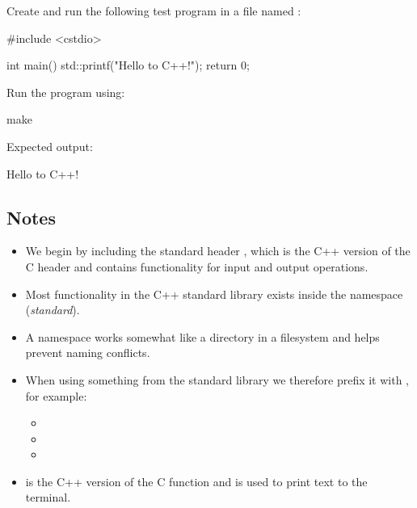 \noindent Create and run the following test program in a file named :

\begin{cppcode}
#include <cstdio>

int main()
{
    std::printf("Hello to C++!\n");
    return 0;
}
\end{cppcode}

\noindent Run the program using:

\begin{shell}
make
\end{shell}

\noindent Expected output:

\begin{console}
Hello to C++!
\end{console}

\subsection{Notes}
\label{c1:sec:compilenotes}
\begin{itemize}
  \item We begin by including the standard header , which is the C++ version of the
    C header  and contains functionality for input and output operations.
  \item Most functionality in the C++ standard library exists inside the namespace 
    (\emph{standard}).
  \item A namespace works somewhat like a directory in a filesystem and helps prevent naming
    conflicts.
  \item When using something from the standard library we therefore prefix it with ,
    for example:
  \begin{itemize}
    \item {}
    \item {}
    \item {}
  \end{itemize}
  \item {} is the C++ version of the C function  and is used to print
    text to the terminal.
\end{itemize}
